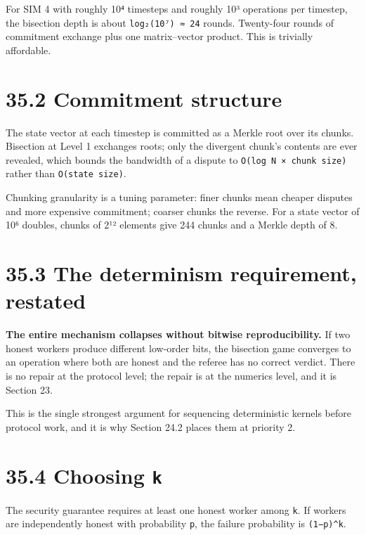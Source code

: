 \documentclass[
  11pt]{report}
\begin{document}
For SIM 4 with roughly 10⁴ timesteps and roughly 10³ operations per
timestep, the bisection depth is about \texttt{log₂(10⁷)\ ≈\ 24} rounds.
Twenty-four rounds of commitment exchange plus one matrix--vector
product. This is trivially affordable.

\hypertarget{commitment-structure}{%
\section{35.2 Commitment structure}\label{commitment-structure}}

The state vector at each timestep is committed as a Merkle root over its
chunks. Bisection at Level 1 exchanges roots; only the divergent chunk's
contents are ever revealed, which bounds the bandwidth of a dispute to
\texttt{O(log\ N\ ×\ chunk\ size)} rather than \texttt{O(state\ size)}.

Chunking granularity is a tuning parameter: finer chunks mean cheaper
disputes and more expensive commitment; coarser chunks the reverse. For
a state vector of 10⁶ doubles, chunks of 2¹² elements give 244 chunks
and a Merkle depth of 8.

\hypertarget{the-determinism-requirement-restated}{%
\section{35.3 The determinism requirement,
restated}\label{the-determinism-requirement-restated}}

\textbf{The entire mechanism collapses without bitwise reproducibility.}
If two honest workers produce different low-order bits, the bisection
game converges to an operation where both are honest and the referee has
no correct verdict. There is no repair at the protocol level; the repair
is at the numerics level, and it is Section 23.

This is the single strongest argument for sequencing deterministic
kernels before protocol work, and it is why Section 24.2 places them at
priority 2.

\hypertarget{choosing-k}{%
\section{\texorpdfstring{35.4 Choosing
\texttt{k}}{35.4 Choosing k}}\label{choosing-k}}

The security guarantee requires at least one honest worker among
\texttt{k}. If workers are independently honest with probability
\texttt{p}, the failure probability is \texttt{(1−p)\^{}k}.
\end{document}
